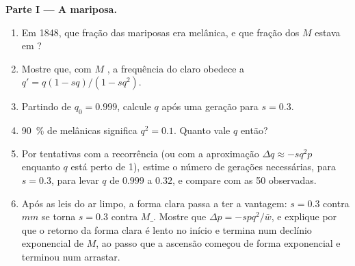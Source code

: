 \begin{problem}
\medskip
\noindent\textbf{Parte I --- A mariposa.}
\begin{enumerate}
  \item Em 1848, que fração das mariposas era melânica, e que fração
        dos  $M$ estava em ?
  \item Mostre que, com $M$ , a frequência do  claro
        obedece a $q' = q(1 - sq)/(1 - sq^{2})$.
  \item Partindo de $q_0 = 0.999$, calcule $q$ após uma geração
        para $s = 0.3$.
  \item \qty{90}{\%} de melânicas significa $q^{2} = 0.1$. Quanto vale $q$ então?
  \item Por tentativas com a recorrência (ou com a aproximação
        $\Delta q \approx -sq^{2}p$ enquanto $q$ está perto de 1), estime o
        número de gerações necessárias, para $s = 0.3$, para levar $q$ de $0.999$
        a $0.32$, e compare com as 50 observadas.
  \item Após as leis do ar limpo, a forma clara passa a ter a vantagem: $s
        = 0.3$ contra $mm$ se torna $s = 0.3$ contra $M\_$. Mostre
        que $\Delta p = -spq^{2}/\bar w$, e explique por que o retorno
        da forma clara é lento no início e termina num declínio
        exponencial de $M$, ao passo que a ascensão começou de forma
        exponencial e terminou num arrastar.
\end{enumerate}


\end{problem}
